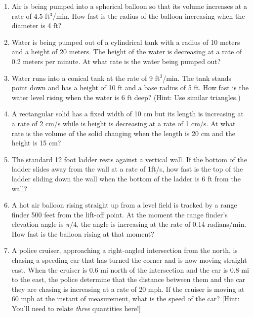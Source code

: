 \documentclass[11pt,fleqn]{article}
\begin{document}
\begin{enumerate}
\item Air is being pumped into a spherical balloon so
that its volume increases at a rate of 4.5 ft$^3$/min. How fast is the
radius of the balloon increasing when the diameter is 4 ft?
\vfill
\item Water is being pumped out of a cylindrical tank with a radius of 10 meters and a height of 20 meters. The height of the water is decreasing at a rate of 0.2 meters per minute. At what rate is the water being pumped out?
\vfill
\newpage

\item  Water runs into a conical tank at the rate of 9
ft$^3$/min. The tank stands point down and has a height of 10 ft and a
base radius of 5 ft. How fast is the water level rising when the water
is 6 ft deep?  (Hint: Use similar triangles.)
\vfill
\item  A rectangular solid has a fixed width of 10 cm but its length is increasing at a rate of 2 cm/s while is height is decreasing at a rate of 1 cm/s. At what rate is the volume of the solid changing when the length is 20 cm and the height is 15 cm?
\vfill
\item  The standard 12 foot ladder rests against a vertical
wall. If the bottom of the ladder slides away from the wall at a rate
of 1ft/s, how fast is the top of the ladder sliding down the wall when
the bottom of the ladder is 6 ft from the wall? 
\vfill
\newpage
\item  A hot air balloon rising straight up from a level
field is tracked by a range finder 500 feet from the lift-off
point. At the moment the range finder's elevation angle is $\pi/4$,
the angle is increasing at the rate of 0.14 radians/min. How fast is
the balloon rising at that moment? 
\vfill

\item  A police cruiser, approaching a right-angled
intersection from the north, is chasing a speeding car that has turned
the corner and is now moving straight east. When the cruiser is 0.6 mi
north of the intersection and the car is 0.8 mi to the east, the
police determine that the distance between them and the car they are
chasing is increasing at a rate of 20 mph. If the cruiser is moving at
60 mph at the instant of measurement, what is the speed of the car?
[Hint: You'll need to relate \textit{three} quantities here!]
\vfill

\end{enumerate}
\end{document}
